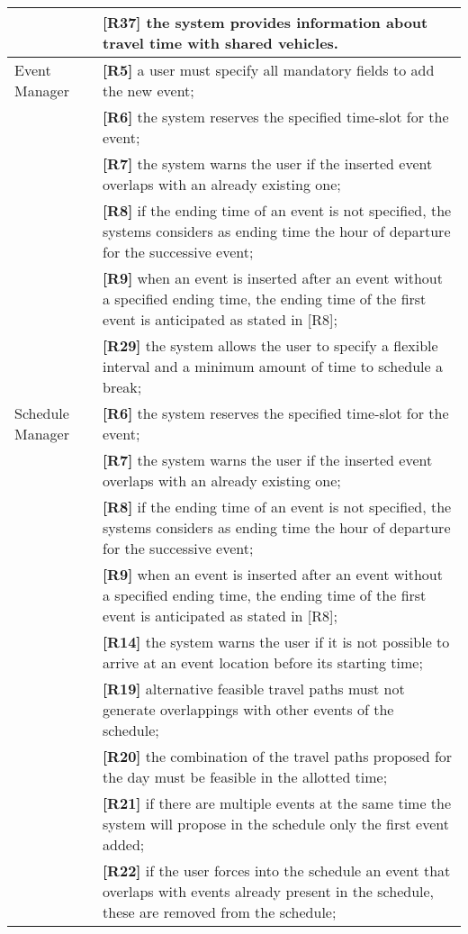 \begin{center}
\begin{longtable}{ | p{} | p{} | }
		& \textbf{[R37]} the system provides information about travel time with shared vehicles.\\
		\hline
		Event Manager & \textbf{[R5]} a user must specify all mandatory fields to add the new event;\\
		& \textbf{[R6]} the system reserves the specified time-slot for the event;\\
		& \textbf{[R7]} the system warns the user if the inserted event overlaps with an already existing one;\\
		& \textbf{[R8]} if the ending time of an event is not specified, the systems considers as ending time the hour of departure for the successive event;\\
		& \textbf{[R9]} when an event is inserted after an event without a specified ending time, the ending time  of the first event is anticipated as stated in [R8];\\
		& \textbf{[R29]} the system allows the user to specify a flexible interval and a minimum amount of time to schedule a break;\\
		\hline
		Schedule Manager & \textbf{[R6]} the system reserves the specified time-slot for the event;\\
		& \textbf{[R7]} the system warns the user if the inserted event overlaps with an already existing one;\\
		& \textbf{[R8]} if the ending time of an event is not specified, the systems considers as ending time the hour of departure for the successive event;\\
		& \textbf{[R9]} when an event is inserted after an event without a specified ending time, the ending time  of the first event is anticipated as stated in [R8];\\
		& \textbf{[R14]} the system warns the user if it is not possible to arrive at an event location before its starting time;\\
		& \textbf{[R19]} alternative feasible travel paths must not generate overlappings with other events of the schedule;\\
		& \textbf{[R20]} the combination of the travel paths proposed for the day must be feasible in the allotted time;\\
		& \textbf{[R21]} if there are multiple events at the same time the system will propose in the schedule only the first event added;\\
		& \textbf{[R22]} if the user forces into the schedule an event that overlaps with events already present in the schedule, these are removed from the schedule;\\

\end{longtable}
\end{center}
